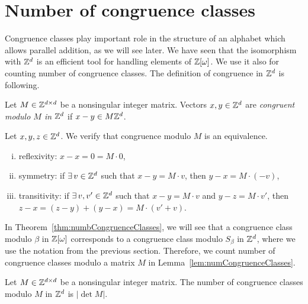 \section{Number of congruence classes}
Congruence classes play important role in the structure of an alphabet which allows parallel addition, as we will see later. We have seen that the isomorphism with $\mathbb{Z}^d$ is an efficient tool for handling elements of $\mathbb{Z}[\omega]$. We use it also for counting number of congruence classes. The definition of congruence in $\mathbb{Z}^d$ is following.
\begin{defn}
Let $M\in\mathbb{Z}^{d\times d}$ be a nonsingular integer matrix. Vectors $x,y \in \mathbb{Z}^d$ are \emph{congruent modulo $M$ in $\mathbb{Z}^d$} if $x-y \in M\mathbb{Z}^d$.
\end{defn}
Let $x,y,z\in\mathbb{Z}^d$. We verify that congruence modulo $M$ is an equivalence. 
\begin{enumerate}[i)]
	\item reflexivity: $x-x=0=M\cdot 0$,
	\item symmetry: if $\exists\, v \in\mathbb{Z}^d$ such that $x-y=M\cdot v$, then $y-x=M\cdot (-v)$,
	\item transitivity: if $\exists\, v,v'\in \mathbb{Z}^d$ such that $x-y=M\cdot v$ and $y-z=M\cdot v'$, then $z-x=(z-y)+(y-x)=M\cdot (v'+v)$.
\end{enumerate}
In Theorem~\ref{thm:numbCongruenceClasses}, we will see that a congruence class modulo $\beta$ in $\mathbb{Z}[\omega]$ corresponds to a congruence class modulo $S_\beta$ in $\mathbb{Z}^d$, where we use the notation from the previous section. Therefore, we count number of congruence classes modulo a matrix $M$ in Lemma~\ref{lem:numCongruenceClasses}.
\begin{lem}
Let $M\in\mathbb{Z}^{d\times d}$ be a nonsingular integer matrix. The number of congruence classes modulo $M$ in $\mathbb{Z}^d$ is $|\det M|$.
\label{lem:numCongruenceClasses}
\end{lem}
